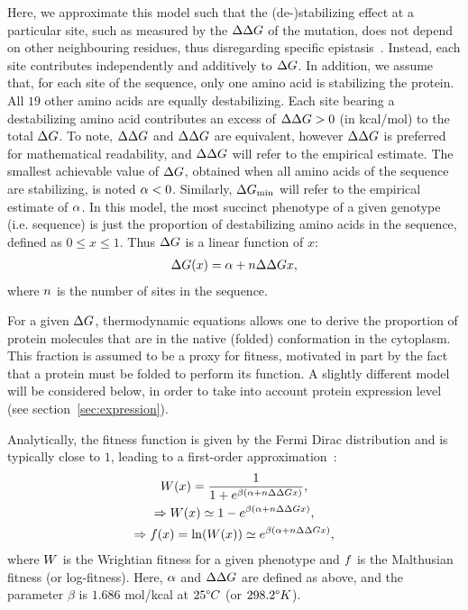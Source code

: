 Here, we approximate this model such that the (de-)stabilizing effect at a particular site, such as measured by the $\Delta \Delta G$ of the mutation, does not depend on other neighbouring residues, thus disregarding specific epistasis~\citep{Dasmeh2014}.
Instead, each site contributes independently and additively to $\Delta G$.
In addition, we assume that, for each site of the sequence, only one amino acid is stabilizing the protein.
All $19$ other amino acids are equally destabilizing.
Each site bearing a destabilizing amino acid contributes an excess of $\Delta \Delta G > 0$ (in kcal/mol) to the total $\Delta G$.
To note, $\Delta \Delta G$ and $\Delta \Delta G$ are equivalent, however $\Delta \Delta G$ is preferred for mathematical readability, and $\Delta \Delta G$ will refer to the empirical estimate.
The smallest achievable value of $\Delta G$, obtained when all amino acids of the sequence are stabilizing, is noted $ \alpha < 0$.
Similarly, $\Delta G_{\text{min}}$ will refer to the empirical estimate of $\alpha$.
In this model, the most succinct phenotype of a given genotype (i.e. sequence) is just the proportion of destabilizing amino acids in the sequence, defined as $0 \leq x \leq 1$.
Thus $\Delta G$ is a linear function of $x$:
\begin{align}
    \Delta G (x) = \alpha + n \Delta \Delta G x,
\end{align}
where $n$ is the number of sites in the sequence.

For a given $\Delta G$, thermodynamic equations allows one to derive the proportion of protein molecules that are in the native (folded) conformation in the cytoplasm.
This fraction is assumed to be a proxy for fitness, motivated in part by the fact that a protein must be folded to perform its function.
A slightly different model will be considered below, in order to take into account protein expression level (see section~\ref{sec:expression}).

Analytically, the fitness function is given by the Fermi Dirac distribution and is typically close to $1$, leading to a first-order approximation~\citep{Goldstein2011}:
\begin{gather}
    W (x) = \dfrac{1}{1 + e^{\beta (\alpha + n \Delta \Delta G x)}},\\
    \Rightarrow W (x) \simeq 1 - e^{\beta (\alpha + n \Delta \Delta G x)},\\
    \Rightarrow f (x) = \ln ( W (x) ) \simeq e^{\beta (\alpha + n \Delta \Delta G x)},
\end{gather}
where $W$ is the Wrightian fitness for a given phenotype and $f $ is the Malthusian fitness (or log-fitness).
Here, $\alpha$ and $\Delta \Delta G$ are defined as above, and the parameter $\beta$ is $1.686$ mol/kcal at $25 \degree C$ (or $298.2 \degree K$).

